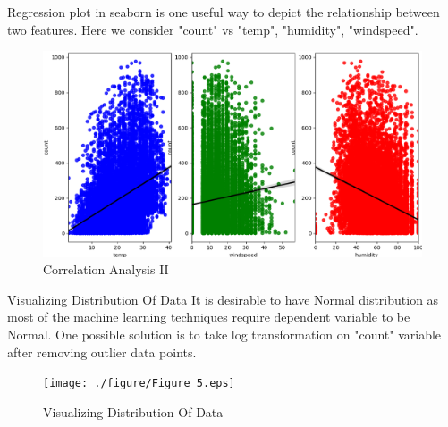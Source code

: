 \documentclass[
 size=14pt,
 paper=smartboard,  %
 mode=present, 		%
 display=slides, 	%
 style=tuliplab,  	%
 pauseslide,
 fleqn,leqno]{powerdot}
\begin{document}
\begin{slide}{}
	Regression plot in seaborn is one useful way to depict the relationship between two features. Here we consider "count" vs "temp", "humidity", "windspeed".
	\begin{figure}[htbp]
		\includegraphics[scale=0.6]{./figure/Figure_4.eps}
		\caption{Correlation Analysis II}
	\end{figure}
\end{slide}

\begin{slide}{Visualizing Distribution Of Data}
	 It is desirable to have Normal distribution as most of the machine learning techniques require dependent variable to be Normal. One possible solution is to take log transformation on "count" variable after removing outlier data points.
	\begin{figure}[htbp]
		\texttt{[image: ./figure/Figure\_5.eps]}
		\caption{Visualizing Distribution Of Data}
	\end{figure}
\end{slide}
\end{document}
